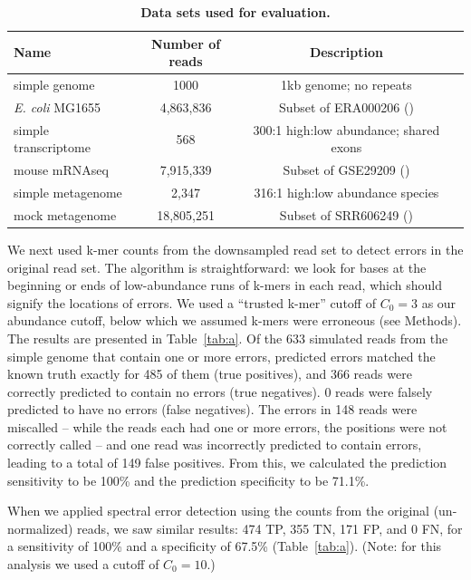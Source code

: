 \documentclass{article}
\begin{document}
\begin{table}

\centering
\begin{tabular}{|l|c|c|l|}
\hline
Name & Number of reads & Description \\
\hline
simple genome & 1000 & 1kb genome; no repeats \\
{\em E. coli} MG1655 & 4,863,836 & Subset of ERA000206 (\cite{chitsaz}) \\
simple transcriptome & 568 & 300:1 high:low abundance; shared exons \\
mouse mRNAseq & 7,915,339 & Subset of GSE29209 (\cite{trinityrna}) \\
simple metagenome & 2,347 & 316:1 high:low abundance species \\
mock metagenome & 18,805,251 & Subset of SRR606249 (\cite{podar}) \\
\hline
\end{tabular}

\caption{{\bf Data sets used for evaluation.}}

\label{tab:data}
\end{table}

We next used k-mer counts from the downsampled read set to detect
errors in the original read set.  The algorithm is straightforward: we
look for bases at the beginning or ends of low-abundance runs of
k-mers in each read, which should signify the locations of errors. We
used a ``trusted k-mer'' cutoff of $C_0 = 3$ as our abundance cutoff,
below which we assumed k-mers were erroneous (see Methods).  The
results are presented in Table~\ref{tab:a}.  Of the 633 simulated
reads from the simple genome that contain one or more errors, predicted
errors matched the known truth exactly for 485 of them (true
positives), and 366 reads were correctly predicted to contain no
errors (true negatives). 0 reads were falsely predicted to have no
errors (false negatives). The errors in 148 reads were miscalled --
while the reads each had one or more errors, the positions were not
correctly called -- and one read was incorrectly predicted to
contain errors, leading to a total of 149 false positives.  From this,
we calculated the prediction sensitivity to be 100\% and the
prediction specificity to be 71.1\%.

When we applied spectral error detection using the counts from the
original (un-normalized) reads, we saw similar results: 474 TP, 355
TN, 171 FP, and 0 FN, for a sensitivity of 100\% and a specificity of
67.5\% (Table~\ref{tab:a}).  (Note: for this analysis we used a cutoff
of $C_0=10$.)
\end{document}
